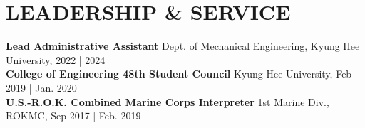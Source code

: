 \documentclass[a4paper,10pt]{extarticle}
\begin{document}


\section*{LEADERSHIP \& SERVICE}
\textbf{Lead Administrative Assistant} \hfill Dept. of Mechanical Engineering, Kyung Hee University, 2022 | 2024\\
\textbf{College of Engineering 48th Student Council} \hfill Kyung Hee University, Feb 2019 | Jan. 2020\\
\textbf{U.S.-R.O.K. Combined Marine Corps Interpreter} \hfill 1st Marine Div., ROKMC, Sep 2017 | Feb. 2019
\end{document}

